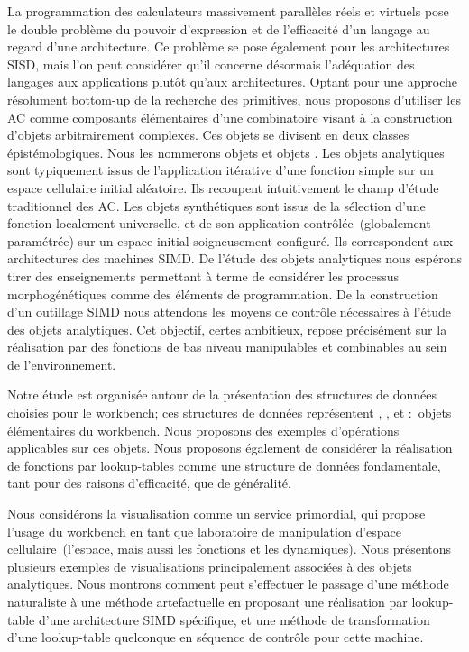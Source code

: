 La programmation des calculateurs massivement parallèles réels et
virtuels pose le double problème du pouvoir d'expression et de
l'efficacité d'un langage au regard d'une architecture. %
Ce problème se pose également pour les architectures SISD, mais l'on
peut considérer qu'il concerne désormais l'adéquation des langages aux
applications plutôt qu'aux architectures. %
Optant pour une approche résolument bottom-up de la recherche des
primitives, nous proposons d'utiliser les AC comme composants
élémentaires d'une combinatoire visant à la construction d'objets
 arbitrairement complexes. %
Ces objets se divisent en deux classes épistémologiques. %
Nous les nommerons objets  et objets
. %
Les objets analytiques sont typiquement issus de l'application
itérative d'une fonction simple sur un espace cellulaire initial
aléatoire. %
Ils recoupent intuitivement le champ d'étude traditionnel des AC\@. %
Les objets synthétiques sont issus de la sélection d'une fonction
localement universelle, et de son application contrôlée~(globalement
paramétrée) sur un espace initial soigneusement configuré. %
Ils correspondent aux architectures des machines SIMD\@. %
De l'étude des objets analytiques nous espérons tirer des
enseignements permettant à terme de considérer les processus
morphogénétiques comme des éléments de programmation. %
De la construction d'un outillage SIMD nous attendons les moyens de
contrôle nécessaires à l'étude des objets analytiques. %
Cet objectif, certes ambitieux, repose précisément sur la réalisation
par  des fonctions de bas niveau manipulables
et combinables au sein de l'environnement. %

Notre étude est organisée autour de la présentation des structures de
données choisies pour le workbench; ces structures de données
représentent , , et
:~objets élémentaires du workbench. %
Nous proposons des exemples d'opérations applicables sur ces objets. %
Nous proposons également de considérer la réalisation de fonctions par
lookup-tables comme une structure de données fondamentale, tant pour
des raisons d'efficacité, que de généralité. %

Nous considérons la visualisation comme un service primordial, qui
propose l'usage du workbench en tant que laboratoire de manipulation
d'espace cellulaire~(l'espace, mais aussi les fonctions et les
dynamiques). %
Nous présentons plusieurs exemples de visualisations principalement
associées à des objets analytiques. %
Nous montrons comment peut s'effectuer le passage d'une méthode
naturaliste à une méthode artefactuelle en proposant une réalisation
par lookup-table d'une architecture SIMD spécifique, et une méthode de
transformation d'une lookup-table quelconque en séquence de contrôle
pour cette machine. %

